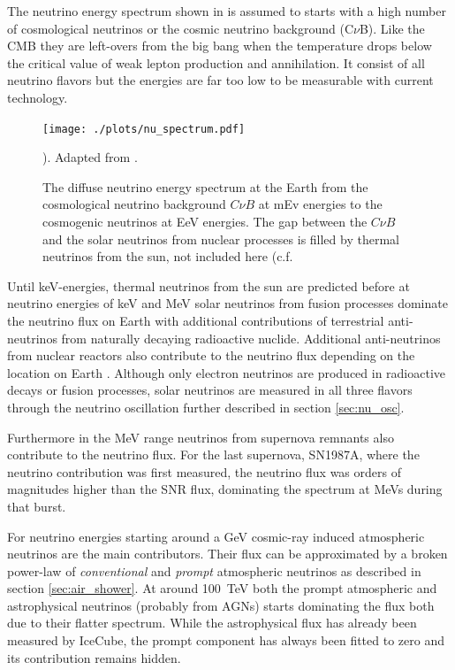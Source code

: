 The neutrino energy spectrum shown in  is assumed to starts with a high number of cosmological neutrinos or the cosmic neutrino background (C$\nu$B).
Like the CMB they are left-overs from the big bang when the temperature drops below the critical value of weak lepton production and annihilation.
It consist of all neutrino flavors but the energies are far too low to be measurable with current technology.
\begin{figure}
    \centering
    \texttt{[image: ./plots/nu\_spectrum.pdf]}
    \caption{The diffuse neutrino energy spectrum at the Earth from the cosmological neutrino background $C\nu B$ at mEv energies to the cosmogenic neutrinos at EeV energies. The gap between the $C\nu B$ and the solar neutrinos from nuclear processes is filled by thermal neutrinos from the sun, not included here (c.f. \cite{Vitagliano20}}). Adapted from \cite{KatzSpiering12}.
    \label{fig:neutrino_spectrum}
\end{figure}

Until keV-energies, thermal neutrinos from the sun are predicted \cite{Vitagliano20} before at neutrino energies of keV and MeV solar neutrinos from fusion processes dominate the neutrino flux on Earth with additional contributions of terrestrial anti-neutrinos from naturally decaying radioactive nuclide.
Additional anti-neutrinos from nuclear reactors also contribute to the neutrino flux depending on the location on Earth \cite{Usman15}.
Although only electron neutrinos are produced in radioactive decays or fusion processes, solar neutrinos are measured in all three flavors through the neutrino oscillation further described in section \ref{sec:nu_osc}.

Furthermore in the MeV range neutrinos from supernova remnants also contribute to the neutrino flux.
For the last supernova, SN1987A, where the neutrino contribution was first measured, the neutrino flux was orders of magnitudes higher than the SNR flux, dominating the spectrum at MeVs during that burst.

For neutrino energies starting around a GeV cosmic-ray induced atmospheric neutrinos are the main contributors.
Their flux can be approximated by a broken power-law of \textit{conventional} and \textit{prompt} atmospheric neutrinos as described in section \ref{sec:air_shower}.
At around \SI{100}{TeV} both the prompt atmospheric and astrophysical neutrinos (probably from AGNs) starts dominating the flux both due to their flatter spectrum.
While the astrophysical flux has already been measured by IceCube, the prompt component has always been fitted to zero and its contribution remains hidden.

